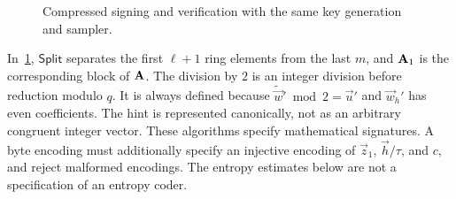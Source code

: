 \begin{figure}[!htbp]
\centering
{}
\par\medskip
{}
\caption{Compressed signing and verification with the same key generation and sampler.}
\label{fig:compressed}
\end{figure}

In~\cref{fig:compressed}, $\mathsf{Split}$ separates the first $\ell+1$ ring elements from the last $m$, and $\mathbf{A}_1$ is the corresponding block of $\mathbf{A}$. The division by $2$ is an integer division before reduction modulo $q$. It is always defined because $\widetilde{\vec w}'\bmod2=\vec u'$ and $\vec{w}_{h}'$ has even coefficients. The hint is represented canonically, not as an arbitrary congruent integer vector. These algorithms specify mathematical signatures. A byte encoding must additionally specify an injective encoding of $\vec z_1$, $\vec h/\tau$, and $c$, and reject malformed encodings. The entropy estimates below are not a specification of an entropy coder.

